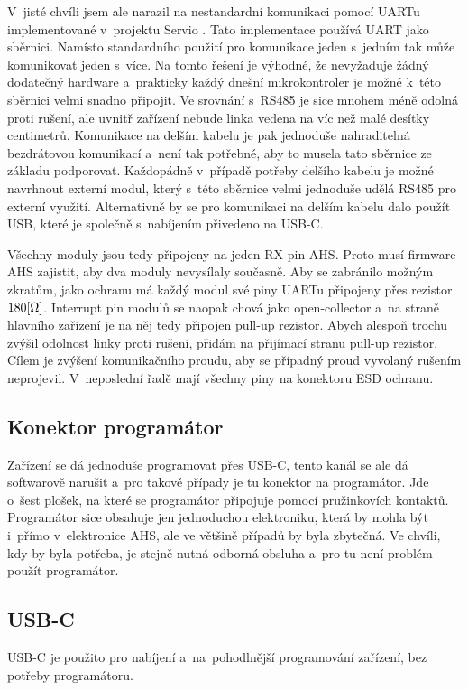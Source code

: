 V~jisté chvíli jsem ale narazil na nestandardní komunikaci pomocí UARTu implementované v~projektu Servio \cite{Servio}.
Tato implementace používá UART jako sběrnici.
Namísto standardního použití pro komunikace jeden s~jedním tak může komunikovat jeden s~více.
Na tomto řešení je výhodné, že nevyžaduje žádný dodatečný hardware a~prakticky každý dnešní mikrokontroler je možné k~této sběrnici velmi snadno připojit.
Ve srovnání s~RS485 je sice mnohem méně odolná proti rušení, ale uvnitř zařízení nebude linka vedena na víc než malé desítky centimetrů.
Komunikace na delším kabelu je pak jednoduše nahraditelná bezdrátovou komunikací a~není tak potřebné, aby to musela tato sběrnice ze základu podporovat.
Každopádně v~případě potřeby delšího kabelu je možné navrhnout externí modul, který s~této sběrnice velmi jednoduše udělá RS485 pro externí využití.
Alternativně by se pro komunikaci na delším kabelu dalo použít USB, které je společně s~nabíjením přivedeno na USB-C.

Všechny moduly jsou tedy připojeny na jeden RX pin AHS.
Proto musí firmware AHS zajistit, aby dva moduly nevysílaly současně.
Aby se zabránilo možným zkratům, jako ochranu má každý modul své piny UARTu připojeny přes rezistor \(180\-[\Omega]\).
Interrupt pin modulů se naopak chová jako open-collector a~na straně hlavního zařízení je na něj tedy připojen pull-up rezistor.
Abych alespoň trochu zvýšil odolnost linky proti rušení, přidám na přijímací stranu pull-up rezistor.
Cílem je zvýšení komunikačního proudu, aby se případný proud vyvolaný rušením neprojevil.
V~neposlední řadě mají všechny piny na konektoru ESD ochranu.

\newpage
\subsection{Konektor programátor}
Zařízení se dá jednoduše programovat přes USB-C, tento kanál se ale dá softwarově narušit a~pro takové případy je tu konektor na programátor.
Jde o~šest plošek, na které se programátor připojuje pomocí pružinkovích kontaktů.
Programátor sice obsahuje jen jednoduchou elektroniku, která by mohla být i~přímo v~elektronice AHS, ale ve většině případů by byla zbytečná.
Ve chvíli, kdy by byla potřeba, je stejně nutná odborná obsluha a~pro tu není problém použít programátor.

\subsection{USB-C}
USB-C je použito pro nabíjení a~na~pohodlnější programování zařízení, bez potřeby programátoru.

